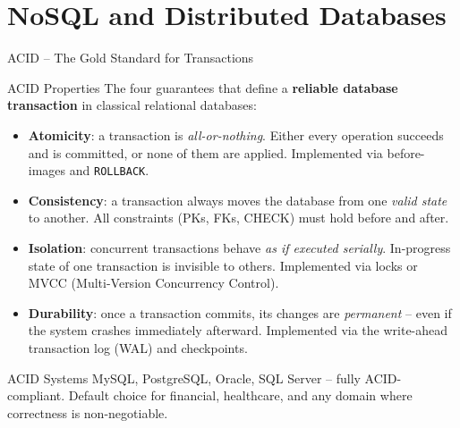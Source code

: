 \section{NoSQL and Distributed Databases}

\begin{frame}{ACID -- The Gold Standard for Transactions}
  \begin{block}{ACID Properties}
    The four guarantees that define a \textbf{reliable database transaction} in classical
    relational databases:
  \end{block}

  \begin{itemize}
    \item \textbf{Atomicity}: a transaction is \emph{all-or-nothing}. Either every operation
          succeeds and is committed, or none of them are applied.
          Implemented via before-images and \texttt{ROLLBACK}.

    \item \textbf{Consistency}: a transaction always moves the database from one \emph{valid state}
          to another. All constraints (PKs, FKs, CHECK) must hold before and after.

    \item \textbf{Isolation}: concurrent transactions behave \emph{as if executed serially}.
          In-progress state of one transaction is invisible to others.
          Implemented via locks or MVCC (Multi-Version Concurrency Control).

    \item \textbf{Durability}: once a transaction commits, its changes are \emph{permanent} --
          even if the system crashes immediately afterward.
          Implemented via the write-ahead transaction log (WAL) and checkpoints.
  \end{itemize}

  \begin{exampleblock}{ACID Systems}
    MySQL, PostgreSQL, Oracle, SQL Server -- fully ACID-compliant.
    Default choice for financial, healthcare, and any domain where correctness is non-negotiable.
  \end{exampleblock}
\end{frame}

